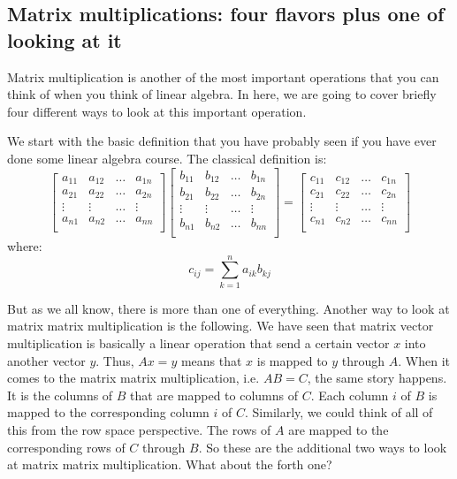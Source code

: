\documentclass[computationalMathematics.tex]{subfiles}
\begin{document}
\subsection{Matrix multiplications: four flavors plus one of looking at it}
\par Matrix multiplication is another of the most important operations that you can think of when you think of linear algebra. In here, we are going to cover briefly four different ways to look at this important operation.
\par We start with the basic definition that you have probably seen if you have ever done some linear algebra course. The classical definition is:
\[
    \begin{bmatrix}
        a_{11} & a_{12} & \dots & a_{1n} \\
        a_{21} & a_{22} & \dots & a_{2n} \\
        \vdots & \vdots & \dots & \vdots \\
        a_{n1} & a_{n2} & \dots & a_{nn} \\
    \end{bmatrix}
    \begin{bmatrix}
        b_{11} & b_{12} & \dots & b_{1n} \\
        b_{21} & b_{22} & \dots & b_{2n} \\
        \vdots & \vdots & \dots & \vdots \\
        b_{n1} & b_{n2} & \dots & b_{nn} \\
    \end{bmatrix}
    =
    \begin{bmatrix}
        c_{11} & c_{12} & \dots & c_{1n} \\
        c_{21} & c_{22} & \dots & c_{2n} \\
        \vdots & \vdots & \dots & \vdots \\
        c_{n1} & c_{n2} & \dots & c_{nn} \\
    \end{bmatrix}
\]
where:
\[
    c_{ij} = \sum_{k=1}^n a_{ik} b_{kj}
\]
\par But as we all know, there is more than one of everything. Another way to look at matrix matrix multiplication is the following. We have seen that matrix vector multiplication is basically a linear operation that send a certain vector $x$ into another vector $y$. Thus, $A x = y$ means that $x$ is mapped to $y$ through $A$. When it comes to the matrix matrix multiplication, i.e. $A B = C$, the same story happens. It is the columns of $B$ that are mapped to columns of $C$. Each column $i$ of $B$ is mapped to the corresponding column $i$ of $C$. Similarly, we could think of all of this from the row space perspective. The rows of $A$ are mapped to the corresponding rows of $C$ through $B$. So these are the additional two ways to look at matrix matrix multiplication. What about the forth one?
\end{document}
